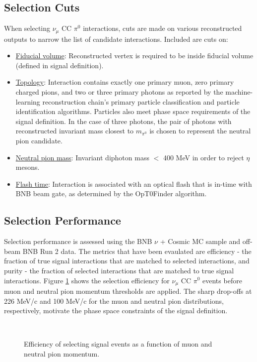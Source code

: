 \documentclass[../main.tex]{subfiles}
\begin{document}
\subsection{Selection Cuts}
When selecting $\nu_{\mu}$ CC $\pi^{0}$ interactions, cuts are made on various reconstructed outputs to narrow the list of candidate interactions.  Included are cuts on:
\begin{itemize}
    \item \underline{Fiducial volume}: Reconstructed vertex is required to be inside fiducial volume (defined in signal definition).
    \item \underline{Topology}: Interaction contains exactly one primary muon, zero primary charged pions, and two or three primary photons as reported by the machine-learning reconstruction chain's primary particle classification and particle identification algorithms.  Particles also meet phase space requirements of the signal definition.  In the case of three photons, the pair of photons with reconstructed invariant mass closest to $m_{\pi^{0}}$ is chosen to represent the neutral pion candidate.
    \item \underline{Neutral pion mass}: Invariant diphoton mass $<$ 400 MeV in order to reject $\eta$ mesons.
    \item \underline{Flash time}: Interaction is associated with an optical flash that is in-time with BNB beam gate, as determined by the OpT0Finder algorithm.
\end{itemize}

\subsection{Selection Performance}
Selection performance is assessed using the BNB $\nu$ + Cosmic MC sample and off-beam BNB Run 2 data.  The metrics that have been evaulated are efficiency - the fraction of true signal interactions that are matched to selected interactions, and purity - the fraction of selected interactions that are matched to true signal interactions.  Figure \ref{fig:prephase_efficiency} shows the selection efficiency for $\nu_{\mu}$ CC $\pi^{0}$ events before muon and neutral pion momentum thresholds are applied.  The sharp drop-offs at 226 MeV/c and 100 MeV/c for the muon and neutral pion distributions, respectively, motivate the phase space constraints of the signal definition.


\begin{figure}[H]
    \center
    \\


    \caption{Efficiency of selecting signal events as a function of muon and neutral pion momentum.}
    \label{fig:prephase_efficiency}
\end{figure}
\end{document}
